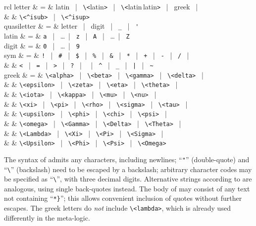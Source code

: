 \begin{isabellebody}
\begin{isamarkuptext}
\begin{matharray}{rcl}
    letter & = & latin ~|~ \verb,\,\verb,<,latin\verb,>, ~|~ \verb,\,\verb,<,latin\,latin\verb,>, ~|~ greek ~|~ \\
           &   & \verb,\<^isub>, ~|~ \verb,\<^isup>, \\
    quasiletter & = & letter ~|~ digit ~|~ \verb,_, ~|~ \verb,', \\
    latin & = & \verb,a, ~|~ \dots ~|~ \verb,z, ~|~ \verb,A, ~|~ \dots ~|~ \verb,Z, \\
    digit & = & \verb,0, ~|~ \dots ~|~ \verb,9, \\
    sym & = & \verb,!, ~|~ \verb,#, ~|~ \verb,$, ~|~ \verb,%, ~|~ \verb,&, ~|~
     \verb,*, ~|~ \verb,+, ~|~ \verb,-, ~|~ \verb,/, ~|~ \\
    & & \verb,<, ~|~ \verb,=, ~|~ \verb,>, ~|~ \verb,?, ~|~ \texttt{\at} ~|~
    \verb,^, ~|~ \verb,_, ~|~ \verb,|, ~|~ \verb,~, \\
    greek & = & \verb,\<alpha>, ~|~ \verb,\<beta>, ~|~ \verb,\<gamma>, ~|~ \verb,\<delta>, ~| \\
          &   & \verb,\<epsilon>, ~|~ \verb,\<zeta>, ~|~ \verb,\<eta>, ~|~ \verb,\<theta>, ~| \\
          &   & \verb,\<iota>, ~|~ \verb,\<kappa>, ~|~ \verb,\<mu>, ~|~ \verb,\<nu>, ~| \\
          &   & \verb,\<xi>, ~|~ \verb,\<pi>, ~|~ \verb,\<rho>, ~|~ \verb,\<sigma>, ~|~ \verb,\<tau>, ~| \\
          &   & \verb,\<upsilon>, ~|~ \verb,\<phi>, ~|~ \verb,\<chi>, ~|~ \verb,\<psi>, ~| \\
          &   & \verb,\<omega>, ~|~ \verb,\<Gamma>, ~|~ \verb,\<Delta>, ~|~ \verb,\<Theta>, ~| \\
          &   & \verb,\<Lambda>, ~|~ \verb,\<Xi>, ~|~ \verb,\<Pi>, ~|~ \verb,\<Sigma>, ~| \\
          &   & \verb,\<Upsilon>, ~|~ \verb,\<Phi>, ~|~ \verb,\<Psi>, ~|~ \verb,\<Omega>, \\
  \end{matharray}

  The syntax of \hyperlink{syntax.string}{\mbox{}} admits any characters, including
  newlines; ``\verb|"|'' (double-quote) and ``\verb|\|'' (backslash) need to be escaped by a backslash; arbitrary
  character codes may be specified as ``\verb|\|'',
  with three decimal digits.  Alternative strings according to
  \hyperlink{syntax.altstring}{\mbox{}} are analogous, using single back-quotes instead.
  The body of \hyperlink{syntax.verbatim}{\mbox{}} may consist of any text not
  containing ``\verb|*|\verb|}|''; this allows
  convenient inclusion of quotes without further escapes.  The greek
  letters do \emph{not} include \verb|\<lambda>|, which is already used
  differently in the meta-logic.


\end{isamarkuptext}
\end{isabellebody}
